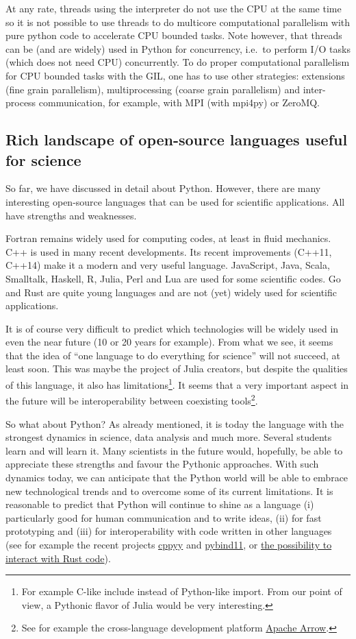 At any rate, threads using the interpreter do not use the CPU at the same time
so it is not possible to use threads to do multicore computational parallelism
with pure python code to accelerate CPU bounded tasks.
%
Note however, that threads can be (and are widely) used in Python for
concurrency, i.e.\ to perform I/O tasks (which does not need CPU) concurrently.
%
To do proper computational parallelism for CPU bounded tasks with the GIL, one has
to use other strategies: extensions (fine grain parallelism), multiprocessing
(coarse grain parallelism) and inter-process communication, for example, with MPI
(with mpi4py) or ZeroMQ.


\subsection{Rich landscape of open-source languages useful for science}

So far, we have discussed in detail about Python. However, there are many
interesting open-source languages that can be used for scientific applications.
All have strengths and weaknesses.

Fortran remains widely used for computing codes, at least in fluid mechanics.
C++ is used in many recent developments. Its recent improvements (C++11, C++14)
make it a modern and very useful language.
%
JavaScript, Java, Scala, Smalltalk, Haskell, R, Julia, Perl and Lua are used for
some scientific codes. Go and Rust are quite young languages and are not (yet)
widely used for scientific applications.

It is of course very difficult to predict which technologies will be widely
used in even the near future (10 or 20 years for example).
%
From what we see, it seems that the idea of ``one language to do everything for
science'' will not succeed, at least soon.  This was maybe the project of Julia
creators, but despite the qualities of this language, it also has
limitations\footnote{For example C-like include instead of Python-like
import. From our point of view, a Pythonic flavor of Julia would be very
interesting.}.
%
It seems that a very important aspect in the future will be interoperability
between coexisting tools\footnote{See for example the cross-language development
platform \href{https://arrow.apache.org/}{Apache Arrow}.}.

So what about Python?  As already mentioned, it is today the language with the
strongest dynamics in science, data analysis and much more.  Several students
learn and will learn it. Many scientists in the future would, hopefully, be
able to appreciate these strengths and favour the Pythonic approaches.  With
such dynamics today, we can anticipate that the Python world will be able to
embrace new technological trends and to overcome some of its current
limitations.
%
It is reasonable to predict that Python will continue to shine as a language
(i) particularly good for human communication and to write ideas, (ii) for fast
prototyping and (iii) for interoperability with code written in other languages
(see for example the recent projects \href{https://cppyy.readthedocs.io}{cppyy}
and \href{https://github.com/pybind/pybind11/}{pybind11}, or
\href{https://github.com/PyO3}{the possibility to interact with Rust code}).

